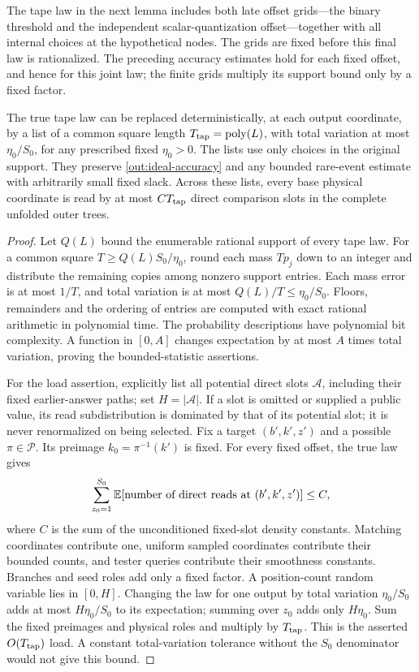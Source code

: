 The tape law in the next lemma includes both late offset grids---the
binary threshold and the independent scalar-quantization offset---together
with all internal choices at the hypothetical nodes. The grids are fixed
before this final law is rationalized. The preceding accuracy estimates
hold for each fixed offset, and hence for this joint law; the finite grids
multiply its support bound only by a fixed factor.

\begin{lemma}\label{out:tapes}
The true tape law can be replaced deterministically, at each output
coordinate, by a list of a common square length $T_{\rm tap}=\operatorname{poly}(L)$,
with total variation at most $\eta_0/S_0$, for any prescribed fixed
$\eta_0>0$. The lists use only choices in the original support. They
preserve \eqref{out:ideal-accuracy} and any bounded rare-event estimate
with arbitrarily small fixed slack. Across these lists, every base
physical coordinate is read by at most $C T_{\rm tap}$ direct
comparison slots in the complete unfolded outer trees.
\end{lemma}
\begin{proof}
Let $Q(L)$ bound the enumerable rational support of every tape law.
For a common square $T\geq Q(L)S_0/\eta_0$, round each mass $Tp_j$
down to an integer and distribute the remaining copies among nonzero
support entries. Each mass error is at most $1/T$, and total variation
is at most $Q(L)/T\leq\eta_0/S_0$. Floors, remainders and the ordering
of entries are computed with exact rational arithmetic in polynomial
time. The probability descriptions have polynomial bit complexity.
A function in $[0,A]$ changes expectation by at most $A$ times total
variation, proving the bounded-statistic assertions.

For the load assertion, explicitly list all potential direct slots
$\mathcal A$, including their fixed earlier-answer paths; set
$H=|\mathcal A|$. If a slot is omitted or supplied a public value, its
read subdistribution is dominated by that of its potential slot; it is
never renormalized on being selected. Fix a target $(b',k',z')$ and a
possible $\pi\in\mathcal P$. Its preimage $k_0=\pi^{-1}(k')$ is fixed.
For every fixed offset, the true law gives
\begin{equation}\label{out:direct-density}
 \sum_{z_0=1}^{S_0}
 \mathbb{E}[\text{number of direct reads at }(b',k',z')]
 \leq C,
\end{equation}
where $C$ is the sum of the unconditioned fixed-slot density constants.
Matching coordinates contribute one, uniform sampled coordinates
contribute their bounded counts, and tester queries contribute their
smoothness constants. Branches and seed roles add only a fixed factor.
A position-count random variable lies in $[0,H]$. Changing the law for
one output by total variation $\eta_0/S_0$ adds at most
$H\eta_0/S_0$ to its expectation; summing over $z_0$ adds only
$H\eta_0$. Sum the fixed preimages and physical roles and multiply by
$T_{\rm tap}$. This is the asserted $O(T_{\rm tap})$ load.
A constant total-variation tolerance without the $S_0$ denominator
would not give this bound.
\end{proof}

